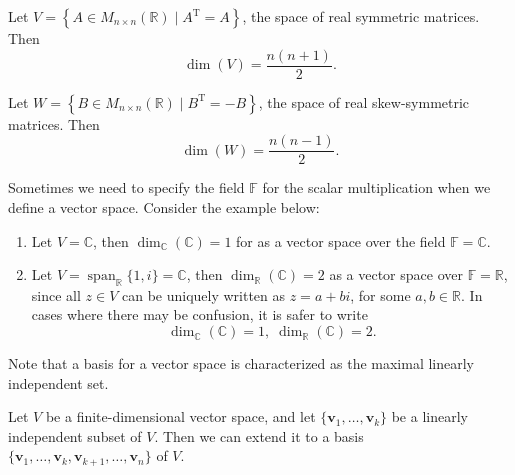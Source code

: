 \begin{example}
Let \(V = \left\{ A \in M_{n \times n}(\mathbb{R}) \mid A^\mathrm{T} = A \right\}\), the space of real symmetric matrices. Then
\[
\dim(V) = \frac{n(n + 1)}{2}.
\]
\end{example}

\begin{example}
Let \(W = \left\{ B \in M_{n \times n}(\mathbb{R}) \mid B^\mathrm{T} = -B \right\}\), the space of real skew-symmetric matrices. Then
\[
\dim(W) = \frac{n(n - 1)}{2}.
\]
\end{example}

\begin{example}
Sometimes we need to specify the field \(\mathbb{F}\) for the scalar multiplication when we define a vector space. Consider the example below:
\begin{enumerate}
    \item Let \(V = \mathbb{C}\), then \(\dim _{\mathbb{C}}\left( \mathbb{C}\right)  = 1\) for as a vector space over the field \(\mathbb{F} = \mathbb{C}\).
    \item Let \(V = \operatorname{span}_{\mathbb{R}}\{ 1,i\}  = \mathbb{C}\), then \(\dim_{\mathbb{R}}\left( \mathbb{C}\right)  = 2\) as a vector space over \(\mathbb{F} = \mathbb{R}\), since all \(z \in  V\) can be uniquely written as \(z = a + {bi}\), for some \(a,b \in  \mathbb{R}\).
    In cases where there may be confusion, it is safer to write
    \[
    {\dim }_{\mathbb{C}}\left( \mathbb{C}\right)  = 1,\;{\dim }_{\mathbb{R}}\left( \mathbb{C}\right)  = 2.
    \]
\end{enumerate}    
\end{example}

Note that a basis for a vector space is characterized as the maximal linearly independent set.

\begin{theorem}\label{thm: basis-extension}
Let $V$ be a finite-dimensional vector space, and let $\{ \mathbf{v}_1, \ldots, \mathbf{v}_k \}$ be a linearly independent subset of $V$. Then we can extend it to a basis $\{ \mathbf{v}_1, \ldots, \mathbf{v}_k, \mathbf{v}_{k+1}, \ldots, \mathbf{v}_n \}$ of $V$.
\end{theorem}

